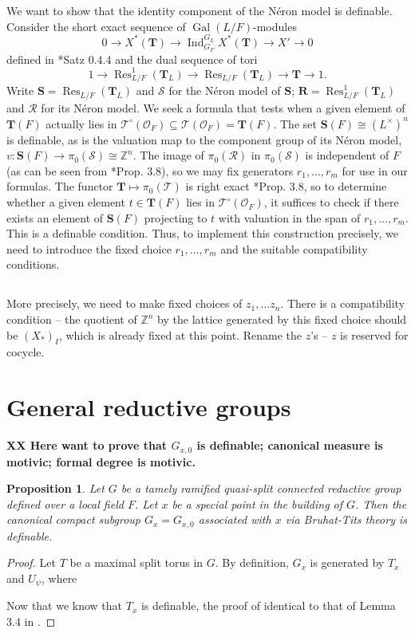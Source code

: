 \documentclass{amsart}
\newcommand{\Z}{{\mathbb Z}}
\newcommand{\ri}{\mathcal{O}}
\newcommand{\bT}{\mathbf {T}}
\newcommand{\bS}{\mathbf{S}}
\newcommand{\bR}{\mathbf{R}}
\newcommand{\Ner}[1]{\mathcal{#1}}
\newcommand{\NerC}[1]{\mathcal{#1}^\circ}
\DeclareMathOperator{\Gal}{Gal}
\DeclareMathOperator{\Ind}{Ind}
\DeclareMathOperator{\Res}{Res}
\theoremstyle{plain}
\newtheorem{prop}[thm]{Proposition}
\theoremstyle{definition}
\begin{document}
We want to show that the identity component of the N\'eron model is definable.  Consider the short exact sequence of $\Gal(L/F)$-modules
\[
0 \to X^*(\bT) \to \Ind_{G_F}^{G_L} X^*(\bT) \to X' \to 0
\]
defined in \cite{brahm}*{Satz 0.4.4} and the dual sequence of tori
\[
1 \to \Res_{L/F}^1(\bT_L) \to \Res_{L/F} (\bT_L) \to \bT \to 1.
\]
Write $\bS = \Res_{L/F} (\bT_L)$ and $\Ner{S}$ for the N\'eron model of $\bS$; $\bR = \Res_{L/F}^1 (\bT_L)$ and $\Ner{R}$ for its N\'eron model. 
We seek a formula that tests when a given element of $\bT(F)$ actually lies in $\NerC{T}(\ri_F) \subseteq \Ner{T}(\ri_F) = \bT(F)$. The set $\bS(F) \cong (L^\times)^n$ is definable, as is the valuation map to the component group of its N\'eron model, $v : \bS(F) \to \pi_0(\Ner{S}) \cong \Z^n$.  The image of $\pi_0(\Ner{R})$ in $\pi_0(\Ner{S})$ is independent of $F$ (as can be seen from \cite{bertrapelle-gonzales:13b}*{Prop. 3.8}), so we may fix generators $r_1, \ldots, r_m$ for use in our formulas.  The functor $\bT \mapsto \pi_0(\Ner{T})$ is right exact \cite{bertrapelle-gonzales:13b}*{Prop. 3.8}, so to determine whether a given element $t \in \bT(F)$ lies in $\NerC{T}(\ri_F)$, it suffices to check if there exists an element of $\bS(F)$ projecting to $t$ with valuation in the span of $r_1, \ldots, r_m$.  This is a definable condition.
Thus, to implement this construction precisely, we need to introduce the fixed choice 
$r_1, \dots, r_m$ and the suitable compatibility conditions. 


\subsection{}More precisely, we need to make fixed choices of $z_1, \dots z_n$. 
There is a compatibility condition -- the quotient of $\Z^n$ by the lattice generated by this fixed choice should be $(X_\ast)_I$, which is already fixed at this point. 
Rename the $z$'s -- $z$ is reserved for cocycle.  

\section{General reductive groups}
{\bf XX Here want to prove that $G_{x, 0}$ is definable; canonical measure is motivic; formal degree is motivic. }
\begin{prop} Let $G$ be a tamely ramified quasi-split connected reductive group defined over a local field $F$. 
Let $x$ be a special point in the building of $G$. 
Then the canonical compact subgroup $G_x=G_{x, 0}$ associated with $x$ via Bruhat-Tits theory is definable. 
\end{prop}
\begin{proof} Let $T$ be a maximal split torus in $G$.
By definition, $G_x$ is generated by $T_x$ and $U_\psi$, where 
 
Now that we know that $T_x$ is definable, the proof of identical to that of Lemma 3.4 in \cite{CGH-2}.  
\end{proof} 

\begin{bibdiv}
\begin{biblist}
\end{biblist}
\end{bibdiv}
\end{document}
